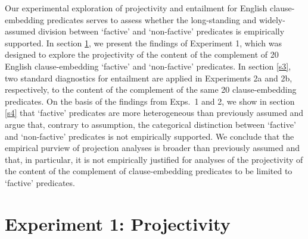 \documentclass[11pt,fleqn]{article}
\newcommand{\6}{\mbox{$[\hspace*{-.6mm}[$}}
\newcommand{\9}{\mbox{$]\hspace*{-.6mm}]$}}
\begin{document}
Our experimental exploration of projectivity and entailment for English clause-embedding predicates serves to assess whether the long-standing and widely-assumed division between `factive' and `non-factive' predicates is empirically supported. In section \ref{s2}, we present the findings of Experiment 1, which was designed to explore the projectivity of the content of the complement of 20 English clause-embedding `factive' and `non-factive' predicates.%
In section \ref{s3}, two standard diagnostics for entailment are applied in Experiments 2a and 2b, respectively, to the content of the complement of the same 20 clause-embedding predicates. On the basis of the findings from Exps.~1 and 2, we show in section \ref{s4} that `factive' predicates are more heterogeneous than previously assumed and argue that, contrary to assumption, the categorical distinction between `factive' and `non-factive' predicates is not empirically supported. We conclude that  the empirical purview of projection analyses is broader than previously assumed and that, in particular, it is not empirically justified for analyses of the projectivity of the content of the complement of clause-embedding predicates to be limited to `factive' predicates.



\section{Experiment 1: Projectivity}\label{s2}
\end{document}
